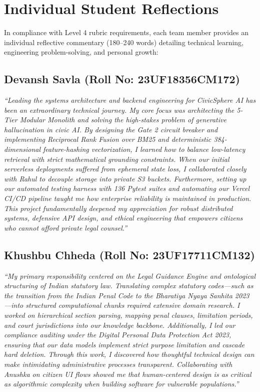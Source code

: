 \section{Individual Student Reflections}
\label{sec:student_reflections}
In compliance with Level 4 rubric requirements, each team member provides an individual reflective commentary (180--240 words) detailing technical learning, engineering problem-solving, and personal growth:

\subsection{Devansh Savla (Roll No: 23UF18356CM172)}
\textit{``Leading the systems architecture and backend engineering for CivicSphere AI has been an extraordinary technical journey. My core focus was architecting the 5-Tier Modular Monolith and solving the high-stakes problem of generative hallucination in civic AI. By designing the Gate 2 circuit breaker and implementing Reciprocal Rank Fusion over BM25 and deterministic 384-dimensional feature-hashing vectorization, I learned how to balance low-latency retrieval with strict mathematical grounding constraints. When our initial serverless deployments suffered from ephemeral state loss, I collaborated closely with Rahul to decouple storage into private S3 buckets. Furthermore, setting up our automated testing harness with 136 Pytest suites and automating our Vercel CI/CD pipeline taught me how enterprise reliability is maintained in production. This project fundamentally deepened my appreciation for robust distributed systems, defensive API design, and ethical engineering that empowers citizens who cannot afford private legal counsel.''}

\subsection{Khushbu Chheda (Roll No: 23UF17711CM132)}
\textit{``My primary responsibility centered on the Legal Guidance Engine and ontological structuring of Indian statutory law. Translating complex statutory codes---such as the transition from the Indian Penal Code to the Bharatiya Nyaya Sanhita 2023---into structured computational chunks required extensive domain research. I worked on hierarchical section parsing, mapping penal clauses, limitation periods, and court jurisdictions into our knowledge backbone. Additionally, I led our compliance auditing under the Digital Personal Data Protection Act 2023, ensuring that our data models implement strict purpose limitation and cascade hard deletion. Through this work, I discovered how thoughtful technical design can make intimidating administrative processes transparent. Collaborating with Anushka on citizen UI flows showed me that human-centered design is as critical as algorithmic complexity when building software for vulnerable populations.''}

